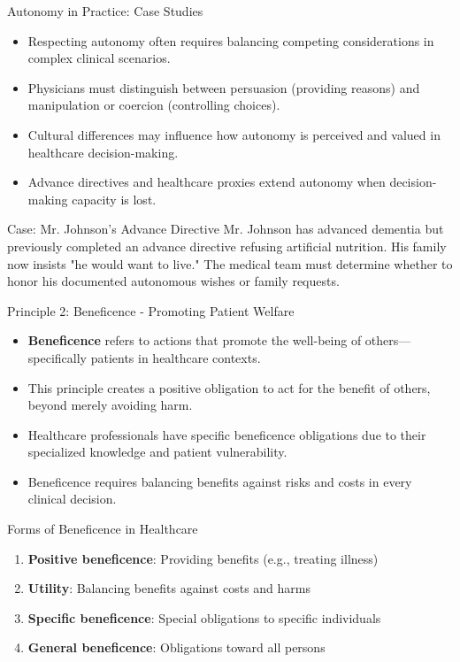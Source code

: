 \documentclass{beamer}
\begin{document}
	
	\begin{frame}{Autonomy in Practice: Case Studies}
		\begin{itemize}
			\item Respecting autonomy often requires balancing competing considerations in complex clinical scenarios.
			\item Physicians must distinguish between persuasion (providing reasons) and manipulation or coercion (controlling choices).
			\item Cultural differences may influence how autonomy is perceived and valued in healthcare decision-making.
			\item Advance directives and healthcare proxies extend autonomy when decision-making capacity is lost.
		\end{itemize}
		
		\begin{exampleblock}{Case: Mr. Johnson's Advance Directive}
			Mr. Johnson has advanced dementia but previously completed an advance directive refusing artificial nutrition. His family now insists "he would want to live." The medical team must determine whether to honor his documented autonomous wishes or family requests.
		\end{exampleblock}
	\end{frame}
	
	\begin{frame}{Principle 2: Beneficence - Promoting Patient Welfare}
		\begin{itemize}
			\item \textbf{Beneficence} refers to actions that promote the well-being of others—specifically patients in healthcare contexts.
			\item This principle creates a positive obligation to act for the benefit of others, beyond merely avoiding harm.
			\item Healthcare professionals have specific beneficence obligations due to their specialized knowledge and patient vulnerability.
			\item Beneficence requires balancing benefits against risks and costs in every clinical decision.
		\end{itemize}
		
		\begin{block}{Forms of Beneficence in Healthcare}
			\begin{enumerate}
				\item \textbf{Positive beneficence}: Providing benefits (e.g., treating illness)
				\item \textbf{Utility}: Balancing benefits against costs and harms
				\item \textbf{Specific beneficence}: Special obligations to specific individuals
				\item \textbf{General beneficence}: Obligations toward all persons
			\end{enumerate}
		\end{block}
	\end{frame}
	
\end{document}
